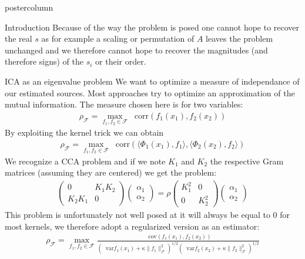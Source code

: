 \documentclass{beamer}
\newcommand*\cov{\mathop{}\!\mathrm{cov}}
\newcommand*\var{\mathop{}\!\mathrm{var}}
\newcommand*\corr{\mathop{}\!\mathrm{corr}}
\begin{document}
\begin{frame}
\begin{columns}
\begin{column}{.5\textwidth}
\begin{beamercolorbox}[center]{postercolumn}
\begin{minipage}{.98\textwidth}
{\begin{myblock}{Introduction}
						Because of the way the problem is posed one cannot hope to recover the real $s$ as for example a scaling or permutation of $A$ leaves the problem unchanged and we therefore cannot hope to recover the magnitudes (and therefore signs) of the $s_i$ or their order.
					\end{myblock}\vfill
					\begin{myblock}{ICA as an eigenvalue problem}
						We want to optimize a measure of independance of our estimated sources. Most approaches try to optimize an approximation of the mutual information. The measure chosen here \cite{Bach2002} is for two variables:
						\begin{align*}
							\rho_\mathcal{F} = \max_{f_1, f_2 \in \mathcal{F}} \corr (f_1(x_1), f_2 (x_2))
						\end{align*}
						By exploiting the kernel trick we can obtain
						\begin{align*}
							\rho_\mathcal{F} = \max_{f_1, f_2 \in \mathcal{F}} \corr ( \langle \Phi_1 (x_1), f_1 \rangle , \langle \Phi_2 (x_2), f_2 \rangle)
						\end{align*}
						We recognize a CCA problem and if we note $K_1$ and $K_2$ the respective Gram matrices (assuming they are centered) we get the problem:
						\begin{align*}
							\begin{pmatrix}
								0 & K_1 K_2 \\
								K_2 K_1 & 0
							\end{pmatrix} \begin{pmatrix}
								\alpha_1 \\ \alpha_2
							\end{pmatrix}
							= \rho \begin{pmatrix}
								K_1^2 & 0 \\
								0 & K_2^2
							\end{pmatrix} \begin{pmatrix}
								\alpha_1 \\ \alpha_2
							\end{pmatrix}
						\end{align*}
						This problem is unfortunately not well posed at it will always be equal to $0$ for most kernels, we therefore adopt a regularized version as an estimator:
						\begin{align*}
							\rho_\mathcal{F} = \max_{f_1, f_2 \in \mathcal{F}} \frac{\cov (f_1(x_1), f_2 (x_2))}{(\var f_1 (x_1) + \kappa \lVert f_1 \rVert^2 _\mathcal{F} )^{1/2} (\var f_2 (x_2) + \kappa \lVert f_2 \rVert^2 _\mathcal{F} )^{1/2}}

\end{align*}
\end{myblock}}
\end{minipage}
\end{beamercolorbox}
\end{column}
\end{columns}
\end{frame}
\end{document}

